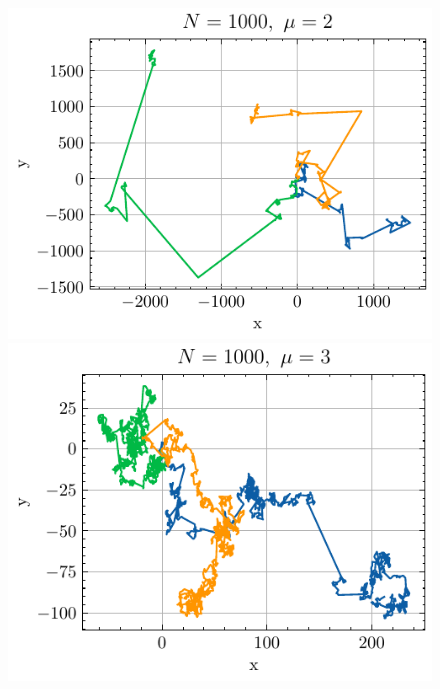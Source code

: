 \documentclass[slovene,11pt,a4paper]{article}
\begin{document}
\begin{figure}[ht]
  \centering
  \begin{minipage}{0.48\textwidth}
    \centering
    \includegraphics[width=\linewidth]{graphs/N=1000mu=2.pdf}
    
  \end{minipage}%
  \hfill%
  \begin{minipage}{0.48\textwidth}
    \centering
    \includegraphics[width=\linewidth]{graphs/N=1000mu=3.pdf}
    
  \end{minipage}


\end{figure}
\end{document}
